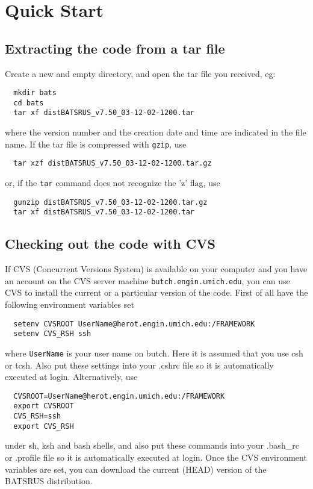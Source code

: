 \section{Quick Start \label{section:quick_start}}

\subsection{Extracting the code from a tar file}

Create a new and empty directory, and open the tar file you received, eg:
\begin{verbatim}
  mkdir bats
  cd bats
  tar xf distBATSRUS_v7.50_03-12-02-1200.tar  
\end{verbatim}
where the version number and the creation date and time are indicated
in the file name. If the tar file is compressed with {\tt gzip}, use
\begin{verbatim}
  tar xzf distBATSRUS_v7.50_03-12-02-1200.tar.gz
\end{verbatim}
or, if the {\tt tar} command does not recognize the 'z' flag, use
\begin{verbatim}
  gunzip distBATSRUS_v7.50_03-12-02-1200.tar.gz
  tar xf distBATSRUS_v7.50_03-12-02-1200.tar
\end{verbatim}

\subsection{Checking out the code with CVS}

If CVS (Concurrent Versions System) is available on your computer
and you have an account on the CVS server machine 
{\tt butch.engin.umich.edu}, you can use CVS to install
the current or a particular version of the code.
First of all have the following environment variables set
\begin{verbatim}
  setenv CVSROOT UserName@herot.engin.umich.edu:/FRAMEWORK
  setenv CVS_RSH ssh
\end{verbatim}
where {\tt UserName} is your user name on butch. Here it is assumed
that you use csh or tcsh. Also put these settings into your .cshrc file
so it is automatically executed at login. Alternatively, use
\begin{verbatim}
  CVSROOT=UserName@herot.engin.umich.edu:/FRAMEWORK
  export CVSROOT
  CVS_RSH=ssh
  export CVS_RSH
\end{verbatim}
under sh, ksh and bash shells, and also put these commands into your 
.bash\_rc or .profile file so it is automatically executed at login.
Once the CVS environment variables are set, you can download the
current (HEAD) version of the BATSRUS distribution.

